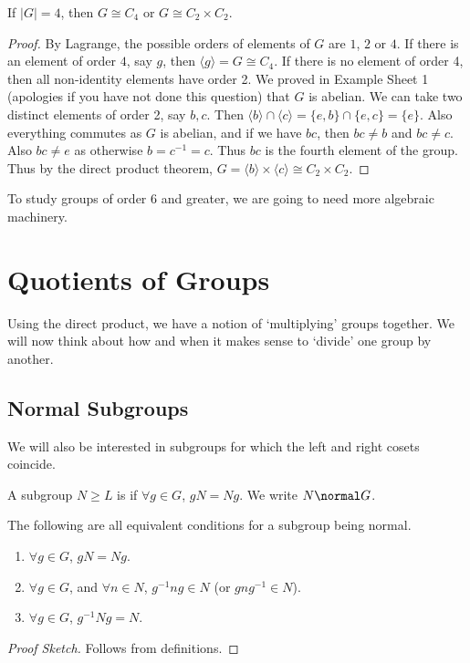 \documentclass[a4]{scrreprt}
\begin{document}
\begin{proposition}
	If $|G| = 4$, then $G \cong C_4$ or $G \cong C_2 \times C_2$.
\end{proposition}
\begin{proof}
	By Lagrange, the possible orders of elements of $G$ are $1$, $2$ or $4$. If there is an element of order $4$, say $g$, then $\langle g \rangle = G \cong C_4$. If there is no element of order 4, then all non-identity elements have order 2. We proved in Example Sheet 1 (apologies if you have not done this question) that $G$ is abelian. We can take two distinct elements of order 2, say $b, c$. Then $\langle b \rangle \cap \langle c \rangle = \{e, b\} \cap \{e, c\} = \{e\}$. Also everything commutes as $G$ is abelian, and if we have $bc$, then $bc \neq b$ and $bc \neq c$. Also $bc \neq e$ as otherwise $b = c^{-1} = c$. Thus $bc$ is the fourth element of the group. Thus by the direct product theorem, $G = \langle b \rangle \times \langle c \rangle \cong C_2 \times C_2$.
\end{proof}

To study groups of order $6$ and greater, we are going to need more algebraic machinery.
 
\chapter{Quotients of Groups}

Using the direct product, we have a notion of `multiplying' groups together. We will now think about how and when it makes sense to `divide' one group by another. 

\section{Normal Subgroups}

We will also be interested in subgroups for which the left and right cosets coincide.

\begin{definition}
	A subgroup $N \geq L$ is  if $\forall g \in G$, $gN = Ng$. We write $N \normal G$.
\end{definition}

\begin{proposition}
	The following are all equivalent conditions for a subgroup being normal.
	\begin{enumerate}[label=(\roman*)]
		\item $\forall g \in G$, $gN = Ng$.
		\item $\forall g \in G$, and $\forall n \in N$, $g^{-1} n g \in N$ (or $g n g^{-1} \in N$).
		\item $\forall g \in G$, $g^{-1} N g = N$.
	\end{enumerate}
\end{proposition}
\begin{proof}[Proof Sketch]
	Follows from definitions.
\end{proof}
\end{document}
